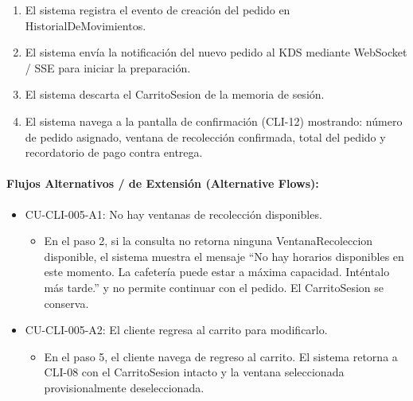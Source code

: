 \begin{enumerate}
\begin{itemize}
    \end{itemize}
    \item[VIII.] El sistema registra el evento de creación del pedido en HistorialDeMovimientos.
    \item[IX.] El sistema envía la notificación del nuevo pedido al KDS mediante WebSocket / SSE para iniciar la preparación.
    \item[X.] El sistema descarta el CarritoSesion de la memoria de sesión.
    \item[XI.] El sistema navega a la pantalla de confirmación (CLI-12) mostrando: número de pedido asignado, ventana de recolección confirmada, total del pedido y recordatorio de pago contra entrega.
\end{enumerate}

\paragraph{Flujos Alternativos / de Extensión (Alternative Flows):}
\begin{itemize}
    \item CU-CLI-005-A1: No hay ventanas de recolección disponibles.
    \begin{itemize}
        \item En el paso 2, si la consulta no retorna ninguna VentanaRecoleccion disponible, el sistema muestra el mensaje ``No hay horarios disponibles en este momento. La cafetería puede estar a máxima capacidad. Inténtalo más tarde.'' y no permite continuar con el pedido. El CarritoSesion se conserva.
    \end{itemize}
    \item CU-CLI-005-A2: El cliente regresa al carrito para modificarlo.
    \begin{itemize}
        \item En el paso 5, el cliente navega de regreso al carrito. El sistema retorna a CLI-08 con el CarritoSesion intacto y la ventana seleccionada provisionalmente deseleccionada.
    \end{itemize}
\end{itemize}

